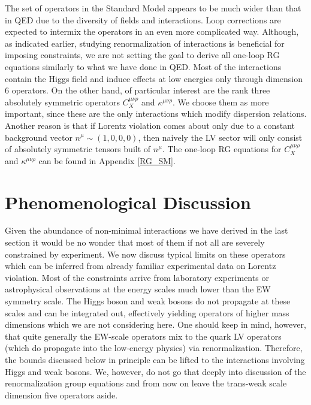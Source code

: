 \documentclass[12pt,preprintnumbers,nofootinbib]{revtex4}
\begin{document}
	The set of operators in the Standard Model appears to be much
	wider than that in QED due to the diversity of fields and interactions.
	Loop corrections are expected to intermix the operators in an 
	even more complicated way.
	Although, as indicated earlier, studying renormalization of interactions
	is beneficial for imposing constraints,
	we are not setting the goal to derive all one-loop RG
	equations similarly to what we have done in QED.
	Most of the interactions contain the Higgs field and induce effects
	at low energies only through dimension 6 operators. 
	On the other hand, of particular interest are
	the rank three absolutely
	symmetric operators $ C_X^{\mu\nu\rho} $ 
	and $ \kappa^{\mu\nu\rho} $.
	We choose them as more important, since these are the only interactions
	which modify dispersion relations.
	Another reason is that if Lorentz violation comes about only 
	due to a constant background vector $ n^{\mu} \sim (1, 0, 0, 0) $,
	then naively the LV sector will only consist of absolutely symmetric
	tensors built of $ n^\mu $.
	The one-loop RG equations for $ C_X^{\mu\nu\rho} $ 
	and $ \kappa^{\mu\nu\rho} $ can be found in Appendix \ref{RG_SM}.


%
%
\section{Phenomenological Discussion}
\label{phenomenology}
	
	Given the abundance of non-minimal interactions we have derived in 
	the last section it would be no wonder that most of them if not all
	are severely constrained by experiment.
	We now discuss typical limits on these operators 
	which can be inferred from already familiar experimental data
	on Lorentz violation.
	Most of the constraints arrive from laboratory experiments
	or astrophysical observations at the energy scales much lower
	than the EW symmetry scale. 
	The Higgs boson and weak bosons do not propagate 
	at these scales and can be integrated out, effectively yielding operators of 
	higher mass dimensions which we are not considering here.
	One should keep in mind, however, that quite generally the EW-scale operators 
	mix to the quark LV operators (which do propagate into the low-energy
	physics) via renormalization. 
	Therefore, the bounds discussed below in principle can be lifted to the 
	interactions involving Higgs and weak bosons. 
	We, however, do not go that deeply into discussion of the renormalization
	group equations and from now on leave the trans-weak scale dimension five 
	operators aside.
	
\end{document}
